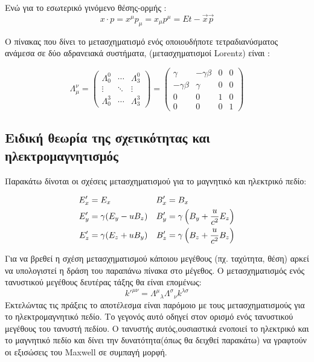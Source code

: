 Ενώ για το εσωτερικό γινόμενο θέσης-ορμής : 
\[
  x\cdot p= x^\mu p_\mu =x_\mu p^\mu= Et-\vec{x}\vec{p}
\]

Ο πίνακας που δίνει το  μετασχηματισμό ενός οποιουδήποτε τετραδιανύσματος ανάμεσα σε δύο αδρανειακά συστήματα, (μετασχηματισμοί \textlatin{Lorentz}) είναι : 

\begin{equation}
  \Lambda_\mu ^\nu=
  \begin{pmatrix}
    \Lambda^0 _0  & \cdots & \Lambda^0 _3 \\
    \vdots & \ddots & \vdots \\
    \Lambda^3 _0  & \cdots & \Lambda^3 _3
  \end{pmatrix}
  =
  \begin{pmatrix}
    \gamma & -\gamma \beta& 0 & 0 \\
    -\gamma \beta & \gamma & 0 & 0 \\
    0 & 0 & 1 & 0 \\
    0 & 0 & 0 & 1
  \end{pmatrix} 
\end{equation}

\subsection{Ειδική θεωρία της σχετικότητας και ηλεκτρομαγνητισμός }
Παρακάτω δίνοται οι σχέσεις μετασχηματισμού για το μαγνητικό και ηλεκτρικό πεδίο:

\begin{align*} 
  E'_x &= E_x        & B'_x &= B_x   
  \\E'_y &= \gamma(E_y-u B_z)         & B'_y &= \gamma \left(  B_y+\frac{u}{c^2}E_z \right)   
  \\E'_z &= \gamma(E_z+u B_y)        & B'_z &= \gamma \left(  B_z+\frac{u}{c^2}B_z \right)    
\end{align*} 

Για να βρεθεί η σχέση μετασχηματισμού κάποιου μεγέθους (πχ. ταχύτητα, θέση) αρκεί να υπολογιστεί η δράση του παραπάνω πίνακα στο μέγεθος. Ο μετασχηματισμός ενός τανυστικού μεγέθους δευτέρας τάξης θα είναι επομένως:
\[
k'^{\mu \nu}= {\Lambda^{\mu}}_{\lambda} {\Lambda^{\sigma}}_{\nu} k^{\lambda \sigma} 
\]
Εκτελώντας τις πράξεις το αποτέλεσμα είναι παρόμοιο με τους μετασχηματισμούς για το ηλεκτρομαγνητικό πεδίο. Το γεγονός αυτό οδηγεί στον ορισμό ενός τανυστικού μεγέθους του τανυστή πεδίου. Ο τανυστής αυτός,ουσιαστικά ενοποιεί το ηλεκτρικό και το μαγνητικό πεδίο και δίνει την δυνατότητα(όπως θα δειχθεί παρακάτω) να γραφτούν οι εξισώσεις του \textlatin{Maxwell} σε συμπαγή μορφή.

